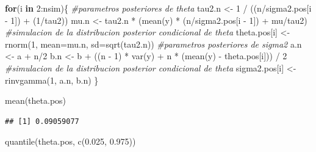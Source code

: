 \documentclass[
  10pt,
  spanish,
]{book}
\newenvironment{Shaded}{\begin{snugshade}}{\end{snugshade}}
\newcommand{\AttributeTok}[1]{\textcolor[rgb]{0.77,0.63,0.00}{#1}}
\newcommand{\CommentTok}[1]{\textcolor[rgb]{0.56,0.35,0.01}{\textit{#1}}}
\newcommand{\ControlFlowTok}[1]{\textcolor[rgb]{0.13,0.29,0.53}{\textbf{#1}}}
\newcommand{\DecValTok}[1]{\textcolor[rgb]{0.00,0.00,0.81}{#1}}
\newcommand{\FloatTok}[1]{\textcolor[rgb]{0.00,0.00,0.81}{#1}}
\newcommand{\FunctionTok}[1]{\textcolor[rgb]{0.00,0.00,0.00}{#1}}
\newcommand{\NormalTok}[1]{#1}
\newcommand{\OtherTok}[1]{\textcolor[rgb]{0.56,0.35,0.01}{#1}}
\newcommand{\SpecialCharTok}[1]{\textcolor[rgb]{0.00,0.00,0.00}{#1}}
\theoremstyle{definition}
\theoremstyle{definition}
\theoremstyle{definition}
\theoremstyle{definition}
\theoremstyle{remark}
\begin{document}
\begin{Shaded}
\begin{Highlighting}[]
\ControlFlowTok{for}\NormalTok{(i }\ControlFlowTok{in} \DecValTok{2}\SpecialCharTok{:}\NormalTok{nsim)\{}
  \CommentTok{\#parametros posteriores de theta  }
\NormalTok{  tau2.n }\OtherTok{\textless{}{-}} \DecValTok{1} \SpecialCharTok{/}\NormalTok{ ((n}\SpecialCharTok{/}\NormalTok{sigma2.pos[i }\SpecialCharTok{{-}} \DecValTok{1}\NormalTok{]) }\SpecialCharTok{+}\NormalTok{ (}\DecValTok{1}\SpecialCharTok{/}\NormalTok{tau2))}
\NormalTok{  mu.n }\OtherTok{\textless{}{-}}\NormalTok{ tau2.n }\SpecialCharTok{*}\NormalTok{ (}\FunctionTok{mean}\NormalTok{(y) }\SpecialCharTok{*}\NormalTok{ (n}\SpecialCharTok{/}\NormalTok{sigma2.pos[i }\SpecialCharTok{{-}} \DecValTok{1}\NormalTok{]) }\SpecialCharTok{+}\NormalTok{ mu}\SpecialCharTok{/}\NormalTok{tau2)}
  \CommentTok{\#simulacion de la distribucion posterior condicional de theta}
\NormalTok{  theta.pos[i] }\OtherTok{\textless{}{-}} \FunctionTok{rnorm}\NormalTok{(}\DecValTok{1}\NormalTok{, }\AttributeTok{mean=}\NormalTok{mu.n, }\AttributeTok{sd=}\FunctionTok{sqrt}\NormalTok{(tau2.n))}
  \CommentTok{\#parametros posteriores de sigma2 }
\NormalTok{  a.n }\OtherTok{\textless{}{-}}\NormalTok{ a }\SpecialCharTok{+}\NormalTok{ n}\SpecialCharTok{/}\DecValTok{2}
\NormalTok{  b.n }\OtherTok{\textless{}{-}}\NormalTok{ b }\SpecialCharTok{+}\NormalTok{ ((n }\SpecialCharTok{{-}} \DecValTok{1}\NormalTok{) }\SpecialCharTok{*} \FunctionTok{var}\NormalTok{(y) }\SpecialCharTok{+}\NormalTok{ n }\SpecialCharTok{*}\NormalTok{ (}\FunctionTok{mean}\NormalTok{(y) }\SpecialCharTok{{-}}\NormalTok{ theta.pos[i])) }\SpecialCharTok{/} \DecValTok{2}
  \CommentTok{\#simulacion de la distribucion posterior condicional de theta}
\NormalTok{  sigma2.pos[i] }\OtherTok{\textless{}{-}} \FunctionTok{rinvgamma}\NormalTok{(}\DecValTok{1}\NormalTok{, a.n, b.n)}
\NormalTok{\}}
\end{Highlighting}
\end{Shaded}

\begin{Shaded}
\begin{Highlighting}[]
\FunctionTok{mean}\NormalTok{(theta.pos)}
\end{Highlighting}
\end{Shaded}

\begin{verbatim}
## [1] 0.09059077
\end{verbatim}

\begin{Shaded}
\begin{Highlighting}[]
\FunctionTok{quantile}\NormalTok{(theta.pos, }\FunctionTok{c}\NormalTok{(}\FloatTok{0.025}\NormalTok{, }\FloatTok{0.975}\NormalTok{))}
\end{Highlighting}
\end{Shaded}
\end{document}
